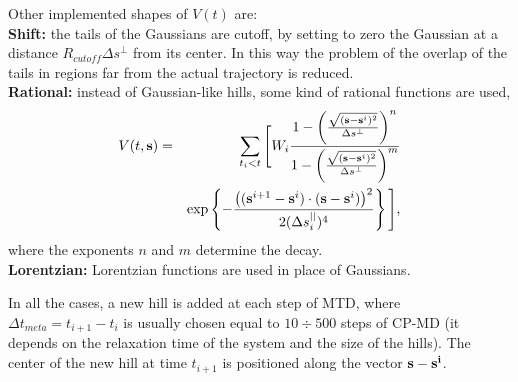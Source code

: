\documentclass[twoside,10pt,titlepage,a4paper]{article}
\begin{document}
Other implemented shapes of $V(t)$ are:\\
{\bf Shift:} the tails of the Gaussians are cutoff, by
setting to zero the Gaussian at a distance $R_{cutoff}\Delta s^{\perp}$
from its center. In this way the problem of the overlap of the
tails in regions far from the actual trajectory is reduced. \\
{\bf Rational:} instead of Gaussian-like hills, some kind of rational functions are used,
\begin{eqnarray}
V(t,{\bf s}) & = & \sum_{t_{i} < t } \Bigg[W_{i}
\frac{1- \left(\frac{\sqrt{({\bf s}-{\bf s}^{i})^{2}}}{\Delta s^{\perp}}\right)^{n}}
{1- \left(\frac{\sqrt{({\bf s}-{\bf s}^{i})^{2}}}{\Delta s^{\perp}}\right)^{m}}
 \nonumber \\
 & & \exp \left
\{-\frac{\left( ({\bf s}^{i+1}-{\bf s}^{i}) \cdot ({\bf s}-{\bf s}^{i})\right)^{2}}
{2 (\Delta s^{||}_{i})^4} \right\}\Bigg],
\label{eq: hills2}
\end{eqnarray}
where the exponents $n$ and $m$ determine the decay. \\
{\bf Lorentzian:} Lorentzian functions are used in place of Gaussians.

In all the cases, a new hill is added at each step of MTD, where
$\Delta t _{meta}=t_{i+1}-t_{i}$ is usually chosen equal to $10\div500$
steps of CP-MD (it depends on the relaxation time of the system and the
size of the hills).
The center of the new hill at time $t_{i+1}$ is positioned along the vector ${\bf s} - {\bf s^{i}}$.
\end{document}
